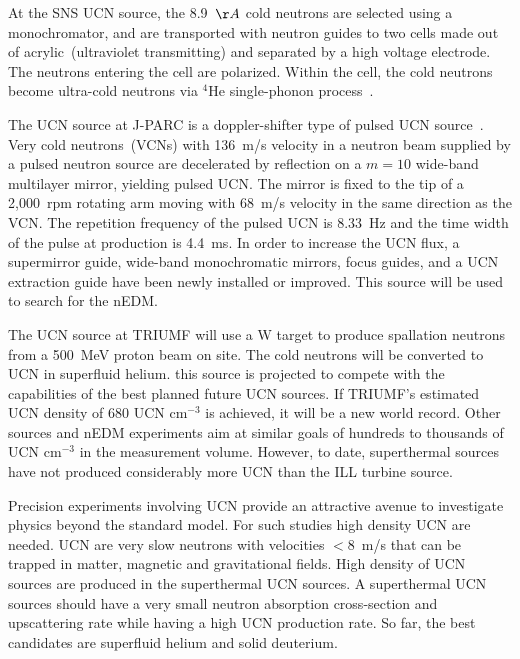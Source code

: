 At the SNS UCN source, the 8.9~$\AA$ cold neutrons are selected using
a monochromator, and are transported with neutron guides to two cells
made out of acrylic~(ultraviolet transmitting) and separated by a high
voltage electrode.  The neutrons entering the cell are
polarized. Within the cell, the cold neutrons become ultra-cold
neutrons via $^4$He single-phonon process~\cite{kolarkar2010}.


The UCN source at J-PARC is a doppler-shifter type of pulsed UCN
source~\cite{Imajo2015}. Very cold neutrons~(VCNs) with 136~m/s
velocity in a neutron beam supplied by a pulsed neutron source are
decelerated by reflection on a $m=10$ wide-band multilayer mirror,
yielding pulsed UCN. The mirror is fixed to the tip of a 2,000~rpm
rotating arm moving with 68~m/s velocity in the same direction as the
VCN. The repetition frequency of the pulsed UCN is 8.33~Hz and the
time width of the pulse at production is 4.4~ms. In order to increase
the UCN flux, a supermirror guide, wide-band monochromatic mirrors,
focus guides, and a UCN extraction guide have been newly installed or
improved. This source will be used to search for the nEDM.


The UCN source at TRIUMF will use a W target to produce spallation
neutrons from a 500~MeV proton beam on site. The cold neutrons will be
converted to UCN in superfluid helium.  this source is projected to
compete with the capabilities of the best planned future UCN
sources. If TRIUMF's estimated UCN density of 680 UCN cm$^{-3}$ is
achieved, it will be a new world record. Other sources and nEDM
experiments aim at similar goals of hundreds to thousands of UCN
cm$^{-3}$ in the measurement volume. However, to date, superthermal
sources have not produced considerably more UCN than the ILL turbine
source.


 


Precision experiments involving UCN provide an attractive avenue to
investigate physics beyond the standard model.  For such studies high
density UCN are needed. UCN are very slow neutrons with velocities
$<8$~m/s that can be trapped in matter, magnetic and gravitational
fields.  High density of UCN sources are produced in the superthermal
UCN sources. A superthermal UCN sources should have a very small
neutron absorption cross-section and upscattering rate while having a
high UCN production rate. So far, the best candidates are superfluid
helium and solid deuterium.


